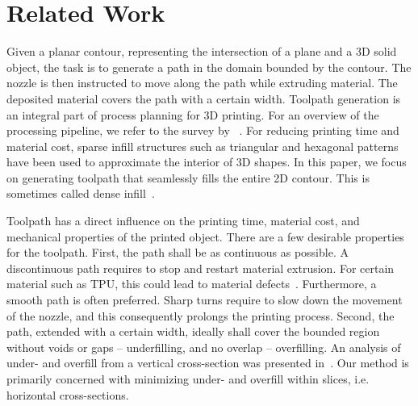 \section{Related Work}

Given a planar contour, representing the intersection of a plane and a 3D solid object, the task is to generate a path in the domain bounded by the contour.
The nozzle is then instructed to move along the path while extruding material.
The deposited material covers the path with a certain width.
Toolpath generation is an integral part of process planning for 3D printing.
For an overview of the processing pipeline, we refer to the survey by \citeauthor{Livesu2017CGF}~\cite{Livesu2017CGF}.
For reducing printing time and material cost, sparse infill structures such as triangular and hexagonal patterns have been used to approximate the interior of 3D shapes.
In this paper, we focus on generating toolpath that seamlessly fills the entire 2D contour.
This is sometimes called dense infill~\cite{Livesu2017CGF}.

Toolpath has a direct influence on the printing time, material cost, and mechanical properties of the printed object.
There are a few desirable properties for the toolpath.
First, the path shall be as continuous as possible.
A discontinuous path requires to stop and restart material extrusion.
For certain material such as TPU, this could lead to material defects~\cite{KUIPERS2019CAD}.
Furthermore, a smooth path is often preferred.
Sharp turns require to slow down the movement of the nozzle, and this consequently prolongs the printing process.
Second, the path, extended with a certain width, ideally shall cover the bounded region without voids or gaps --  underfilling, and no overlap -- overfilling. 
An analysis of under- and overfill from a vertical cross-section was presented in~\cite{Han2002JMSE}. 
Our method is primarily concerned with minimizing under- and overfill within slices, i.e. horizontal cross-sections.

